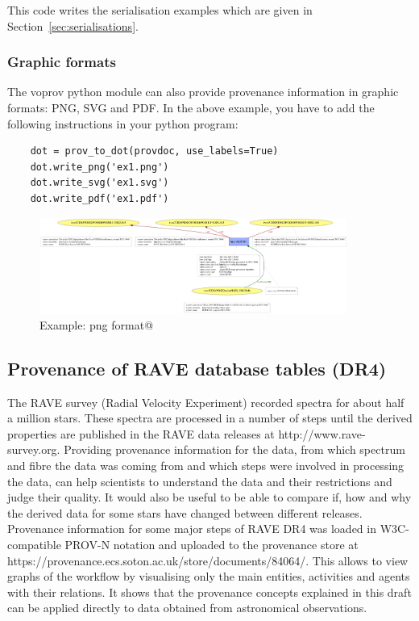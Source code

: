 This code writes the serialisation examples which are given in Section~\ref{sec:serialisations}.

\subsubsection{Graphic formats}
\label{sec:graphic_formats}
The voprov python module can also provide provenance information in graphic formats: PNG, SVG and PDF.
In the above example, you have to add the following instructions in your python program:

\begin{verbatim}
    dot = prov_to_dot(provdoc, use_labels=True)
    dot.write_png('ex1.png')
    dot.write_svg('ex1.svg')
    dot.write_pdf('ex1.pdf')
\end{verbatim}

\begin{figure}
\centering
\includegraphics[width=0.9\textwidth]{access_ex1.png}
\caption{Example: png format@}
\label{fig:example}
\end{figure}



\subsection{Provenance of RAVE database tables (DR4)}
The RAVE survey (Radial Velocity Experiment) recorded spectra for about half a 
million stars. These spectra are processed in a number of steps until the 
derived properties are published in the RAVE data releases at http://www.rave-survey.org.
Providing provenance information for the data, from which spectrum and fibre the
data was coming from and which steps were involved in processing the data, can help scientists
to understand the data and their restrictions and judge their quality.
It would also be useful to be able to compare if, how and why the derived data 
for some stars have changed between different releases.
Provenance information for some major steps of RAVE DR4 was loaded in 
W3C-compatible PROV-N notation and uploaded to the provenance store at 
https://provenance.ecs.soton.ac.uk/store/documents/84064/. This allows to view 
graphs of the workflow by visualising only the main entities, activities and agents 
with their relations. It shows that the provenance concepts explained in this draft 
can be applied directly to data obtained from astronomical observations.

